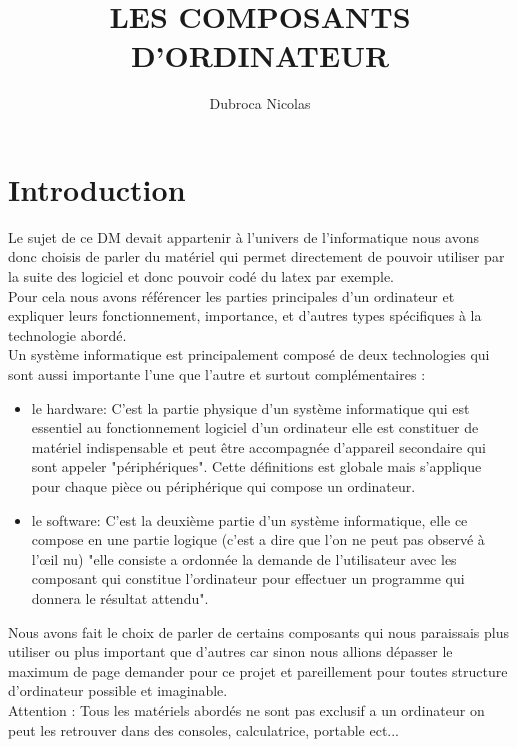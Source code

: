 \documentclass[a4paper,12pt]{article}
\title{LES COMPOSANTS D'ORDINATEUR}
\author{Dubroca Nicolas}
\date{}
\begin{document}
    \maketitle
    
    \section{Introduction}
    Le sujet de ce DM devait appartenir à l'univers de l'informatique nous avons donc choisis de parler du matériel qui permet directement de pouvoir utiliser par la suite des logiciel et donc pouvoir codé du latex par exemple. \\
    Pour cela nous avons référencer les parties principales d'un ordinateur et expliquer leurs fonctionnement, importance, et d'autres types spécifiques à la technologie abordé. \\
    Un système informatique est principalement composé de deux technologies qui sont aussi importante l'une que l'autre et surtout complémentaires : \\
    
    \begin{itemize}
        \item le hardware\footnotemark[1] : C'est la partie physique d'un système informatique qui est essentiel au fonctionnement logiciel d'un ordinateur elle est constituer de matériel indispensable et peut être accompagnée d'appareil secondaire qui sont appeler "périphériques". Cette définitions est globale mais s'applique pour chaque pièce ou périphérique qui compose un ordinateur. \\
        \item le software\footnotemark[2] : C'est la deuxième partie d'un système informatique, elle ce compose en une partie logique (c'est a dire que l'on ne peut pas observé à l’œil nu) "elle consiste a ordonnée la demande de l'utilisateur avec les composant qui constitue l'ordinateur pour effectuer un programme qui donnera le résultat attendu". \citep{Livre1}\\
    \end{itemize}
    
    Nous avons fait le choix de parler de certains composants qui nous paraissais plus utiliser ou plus important que d'autres car sinon nous allions dépasser le maximum de page demander pour ce projet et pareillement pour toutes structure d'ordinateur possible et imaginable. \\
    Attention : Tous les matériels abordés ne sont pas exclusif a un ordinateur on peut les retrouver dans des consoles, calculatrice, portable ect...
    
\end{document}
